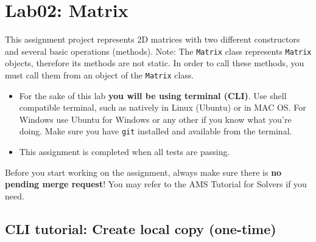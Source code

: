 \chapter{Lab02: Matrix}\label{lab02-matrix}

This assignment project represents 2D matrices with two different constructors and several basic operations (methods). Note: The \texttt{Matrix} class represents \texttt{Matrix} objects, therefore its methods are not static. In order to call these methods, you must call them from an object of the \texttt{Matrix} class.

\begin{itemize}
\item
  For the sake of this lab \textbf{you will be using terminal (CLI)}. Use shell compatible terminal, such as natively in Linux (Ubuntu) or in MAC OS. For Windows use Ubuntu for Windows or any other if you know what you're doing. Make sure you have \texttt{git} installed and available from the terminal.
\item
  This assignment is completed when all tests are passing.
\end{itemize}

Before you start working on the assignment, always make sure there is \textbf{no pending merge request}! You may refer to the AMS Tutorial for Solvers if you need.

\section{CLI tutorial: Create local copy (one-time)}\label{cli-tutorial-create-local-copy-one-time}

